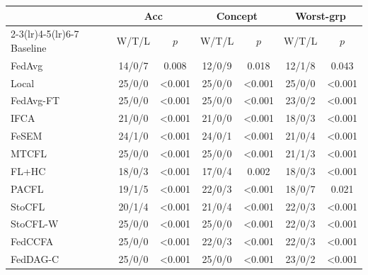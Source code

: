 \scriptsize
\setlength{\tabcolsep}{4pt}
\begin{tabular}{lcccccc}
\toprule
 & \multicolumn{2}{c}{Acc} & \multicolumn{2}{c}{Concept} & \multicolumn{2}{c}{Worst-grp} \\
\cmidrule(lr){2-3}\cmidrule(lr){4-5}\cmidrule(lr){6-7}
Baseline & W/T/L & $p$ & W/T/L & $p$ & W/T/L & $p$ \\
\midrule
FedAvg & 14/0/7 & 0.008 & 12/0/9 & 0.018 & 12/1/8 & 0.043 \\
Local & 25/0/0 & <0.001 & 25/0/0 & <0.001 & 25/0/0 & <0.001 \\
FedAvg-FT & 25/0/0 & <0.001 & 25/0/0 & <0.001 & 23/0/2 & <0.001 \\
IFCA & 21/0/0 & <0.001 & 21/0/0 & <0.001 & 18/0/3 & <0.001 \\
FeSEM & 24/1/0 & <0.001 & 24/0/1 & <0.001 & 21/0/4 & <0.001 \\
MTCFL & 25/0/0 & <0.001 & 25/0/0 & <0.001 & 21/1/3 & <0.001 \\
FL+HC & 18/0/3 & <0.001 & 17/0/4 & 0.002 & 18/0/3 & <0.001 \\
PACFL & 19/1/5 & <0.001 & 22/0/3 & <0.001 & 18/0/7 & 0.021 \\
StoCFL & 20/1/4 & <0.001 & 21/0/4 & <0.001 & 22/0/3 & <0.001 \\
StoCFL-W & 25/0/0 & <0.001 & 25/0/0 & <0.001 & 22/0/3 & <0.001 \\
FedCCFA & 25/0/0 & <0.001 & 22/0/3 & <0.001 & 22/0/3 & <0.001 \\
FedDAG-C & 25/0/0 & <0.001 & 25/0/0 & <0.001 & 23/0/2 & <0.001 \\
\bottomrule
\end{tabular}
